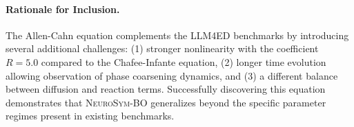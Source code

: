 \paragraph{Rationale for Inclusion.}
The Allen-Cahn equation complements the LLM4ED benchmarks by introducing several additional challenges: (1) stronger nonlinearity with the coefficient $R=5.0$ compared to the Chafee-Infante equation, (2) longer time evolution allowing observation of phase coarsening dynamics, and (3) a different balance between diffusion and reaction terms. Successfully discovering this equation demonstrates that \textsc{NeuroSym-BO} generalizes beyond the specific parameter regimes present in existing benchmarks.